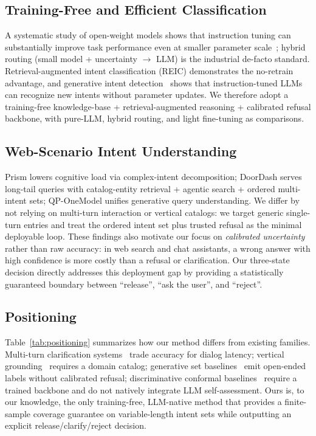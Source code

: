 \documentclass[sigconf, anonymous, review]{acmart}
\begin{document}
\subsection{Training-Free and Efficient Classification}
A systematic study of open-weight models shows that instruction tuning can substantially improve task performance even at smaller parameter scale~\citep{zhou2023lima,chung2022scaling}; hybrid routing (small model + uncertainty $\to$ LLM) is the industrial de-facto standard. Retrieval-augmented intent classification (REIC) demonstrates the no-retrain advantage, and generative intent detection~\citep{zhang2024disc2gen} shows that instruction-tuned LLMs can recognize new intents without parameter updates. We therefore adopt a training-free knowledge-base + retrieval-augmented reasoning + calibrated refusal backbone, with pure-LLM, hybrid routing, and light fine-tuning as comparisons.

\subsection{Web-Scenario Intent Understanding}
Prism lowers cognitive load via complex-intent decomposition; DoorDash serves long-tail queries with catalog-entity retrieval + agentic search + ordered multi-intent sets; QP-OneModel unifies generative query understanding. We differ by not relying on multi-turn interaction or vertical catalogs: we target generic single-turn entries and treat the ordered intent set plus trusted refusal as the minimal deployable loop. These findings also motivate our focus on \emph{calibrated uncertainty} rather than raw accuracy: in web search and chat assistants, a wrong answer with high confidence is more costly than a refusal or clarification. Our three-state decision directly addresses this deployment gap by providing a statistically guaranteed boundary between ``release'', ``ask the user'', and ``reject''.

\subsection{Positioning}
Table~\ref{tab:positioning} summarizes how our method differs from existing families. Multi-turn clarification systems~\citep{prism2026} trade accuracy for dialog latency; vertical grounding~\citep{doordash2026} requires a domain catalog; generative set baselines~\citep{qp-onemodel} emit open-ended labels without calibrated refusal; discriminative conformal baselines~\citep{cicc,mulaconf} require a trained backbone and do not natively integrate LLM self-assessment. Ours is, to our knowledge, the only training-free, LLM-native method that provides a finite-sample coverage guarantee on variable-length intent sets while outputting an explicit release/clarify/reject decision.
\end{document}
